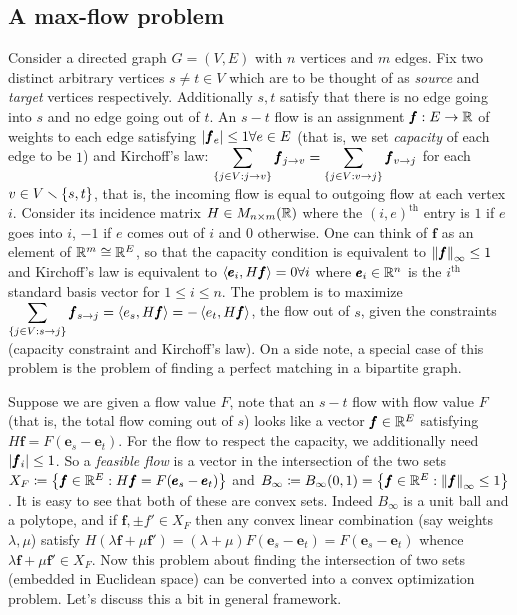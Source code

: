 \subsection{A max-flow problem}
Consider a directed graph $G=(V,E)$ with $n$ vertices and $m$ edges. Fix two distinct arbitrary vertices $s\neq t\in V$ which are to be thought of as \textit{source} and \textit{target} vertices respectively. Additionally $s,t$ satisfy that there is no edge going into $s$ and no edge going out of $t$. An $s-t$ flow is an assignment $\pmb f:E\to \mathbb{R}$ of weights to each edge satisfying $\left| \pmb f_{e} \right|\leq 1\forall e\in E$ (that is, we set \textit{capacity} of each edge to be $1$) and Kirchoff's law: $\displaystyle \sum_{\left\{j\in V:j\to v\right\}}\pmb f_{j\to v} = \sum_{\left\{j\in V:v\to j\right\}}\pmb f_{v\to j}$ for each $v\in V\smallsetminus\left\{s,t\right\}$, that is, the incoming flow is equal to outgoing flow at each vertex $i$. 
Consider its incidence matrix $H\in M_{n\times m}(\mathbb{R})$ where the $(i,e)^{\text{th}}$ entry is $1$ if $e$ goes into $i$, $-1$ if $e$ comes out of $i$ and $0$ otherwise. One can think of $\pmb f$ as an element of $\mathbb{R}^m\cong \mathbb{R}^E$, so that the capacity condition is equivalent to $\left\lVert \pmb f \right\rVert_{\infty}\leq 1$ and Kirchoff's law is equivalent to $\left\langle \pmb e_i, H\pmb f \right\rangle=0\forall i$ where $\pmb e_i\in \mathbb{R}^n$ is the $i^{\text{th}}$ standard basis vector for $1\leq i\leq n$. The problem is to maximize $\displaystyle \sum_{\left\{j\in V:s\to j\right\}}\pmb f_{s\to j} = \left\langle e_s, H\pmb f \right\rangle = -\left\langle e_t, H\pmb f \right\rangle$, the flow out of $s$, given the constraints (capacity constraint and Kirchoff's law). On a side note, a special case of this problem is the problem of finding a perfect matching in a bipartite graph.

Suppose we are given a flow value $F$, note that an $s-t$ flow with flow value $F$ (that is, the total flow coming out of $s$) looks like a vector $\pmb f\in \mathbb{R}^E$ satisfying $H\pmb f = F(\pmb e_s-\pmb e_t)$. For the flow to respect the capacity, we additionally need $\left| \pmb f_i \right|\leq 1$. So a \textit{feasible flow} is a vector in the intersection of the two sets $X_F \coloneqq \left\{\pmb f\in \mathbb{R}^E: H\pmb f = F(\pmb e_s-\pmb e_t)\right\}$ and $B_\infty\coloneqq B_\infty(0,1) = \left\{\pmb f\in \mathbb{R}^E: \left\lVert \pmb f \right\rVert_{\infty}\leq 1\right\}$. It is easy to see that both of these are convex sets. Indeed $B_\infty$ is a unit ball and a polytope, and if $\pmb f,\pm f'\in X_F$ then any convex linear combination (say weights $\lambda,\mu$) satisfy $H(\lambda \pmb f+\mu\pmb f') = (\lambda+\mu)F(\pmb e_s-\pmb e_t) = F(\pmb e_s-\pmb e_t)$ whence $\lambda \pmb f+\mu\pmb f'\in X_F$. Now this problem about finding the intersection of two sets (embedded in Euclidean space) can be converted into a convex optimization problem. Let's discuss this a bit in general framework.

